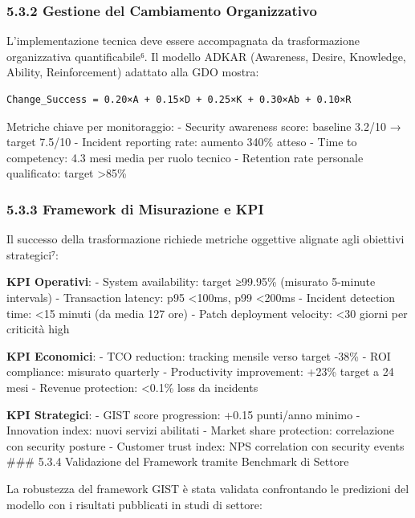 \documentclass{report}
\begin{document}
\subsubsection{5.3.2 Gestione del Cambiamento
Organizzativo}\label{gestione-del-cambiamento-organizzativo}

L'implementazione tecnica deve essere accompagnata da trasformazione
organizzativa quantificabile⁶. Il modello ADKAR (Awareness, Desire,
Knowledge, Ability, Reinforcement) adattato alla GDO mostra:

\begin{verbatim}
Change_Success = 0.20×A + 0.15×D + 0.25×K + 0.30×Ab + 0.10×R
\end{verbatim}

Metriche chiave per monitoraggio: - Security awareness score: baseline
3.2/10 → target 7.5/10 - Incident reporting rate: aumento 340\% atteso -
Time to competency: 4.3 mesi media per ruolo tecnico - Retention rate
personale qualificato: target \textgreater85\%

\subsubsection{5.3.3 Framework di Misurazione e
KPI}\label{framework-di-misurazione-e-kpi}

Il successo della trasformazione richiede metriche oggettive alignate
agli obiettivi strategici⁷:

\textbf{KPI Operativi}: - System availability: target ≥99.95\% (misurato
5-minute intervals) - Transaction latency: p95 \textless100ms, p99
\textless200ms - Incident detection time: \textless15 minuti (da media
127 ore) - Patch deployment velocity: \textless30 giorni per criticità
high

\textbf{KPI Economici}: - TCO reduction: tracking mensile verso target
-38\% - ROI compliance: misurato quarterly - Productivity improvement:
+23\% target a 24 mesi - Revenue protection: \textless0.1\% loss da
incidents

\textbf{KPI Strategici}: - GIST score progression: +0.15 punti/anno
minimo - Innovation index: nuovi servizi abilitati - Market share
protection: correlazione con security posture - Customer trust index:
NPS correlation con security events \#\#\# 5.3.4 Validazione del
Framework tramite Benchmark di Settore

La robustezza del framework GIST è stata validata confrontando le
predizioni del modello con i risultati pubblicati in studi di settore:
\end{document}
